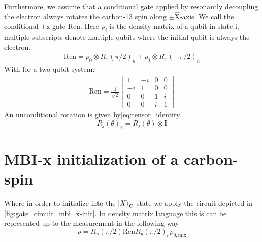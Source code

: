 Furthermore, we assume that a conditional gate applied by resonantly decoupling the electron always rotates the carbon-13 spin along $\pm\hat{\mathrm{X}}$-axis.
We call the conditional $\pm\mathrm{x}$-gate $\bm{\mathrm{Ren}}$. Here $\rho_{i}$ is the density matrix of a qubit in state i, multiple subscripts denote multiple qubits where the initial qubit is always the electron.
\begin{align}
    \bm{\mathrm{Ren}} = \rho_{0}\otimes R_x(\pi/2)_n + \rho_{1}\otimes R_x(-\pi/2)_n
    \end{align}
    With for a two-qubit system:
    \begin{align}
    \bm{\mathrm{Ren}} = \frac{1}{\sqrt{2}}
        \begin{bmatrix}
            1& -i &0 &0 \\
            -i & 1 &0 &0 \\
            0 & 0 &1 &i \\
            0 & 0 &i &1
        \end{bmatrix}
\end{align}
An unconditional rotation is given by\cref{eq:tensor_identity}.
\begin{equation}
    R_j(\theta)_e = R_j(\theta) \otimes \bm{I}
    \label{eq:tensor_identity}
\end{equation}

\section{MBI-x initialization of a carbon-spin}

Where in order to initialize into the ${\left\vert{X}\right\rangle}_\mathrm{C}$-state we apply the circuit depicted in \cref{fig:gate_circuit_mbi_x-init}. In density matrix language this is can be represented up to the measurement in the following way
\begin{equation}
    \rho = R_x(\pi/2) \bm{\mathrm{Ren}} R_y(\pi/2)_e \rho_{0,\mathrm{mix}}
\end{equation}




